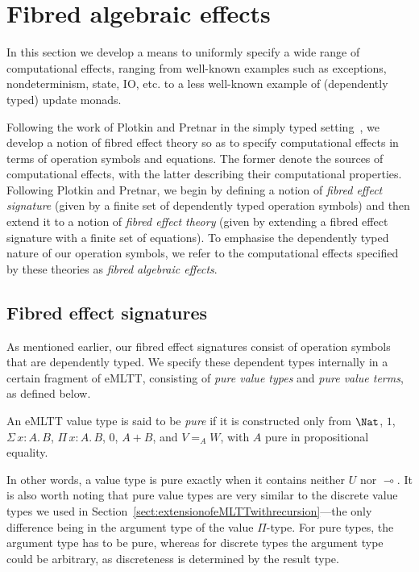 \section{Fibred algebraic effects}
\label{sect:fibeffecttheories}

In this section we develop a means to uniformly specify a wide range of computational effects, ranging from well-known examples such as exceptions, nondeterminism, state, IO, etc. to a less well-known example of (dependently typed) update monads. 

Following the work of Plotkin and Pretnar in the simply typed setting~\cite{Plotkin:HandlingEffects}, we develop a notion of fibred effect theory so as to specify computational effects in terms of operation symbols and equations. 
The former denote the sources of computational effects, with the latter describing their computational properties. 
Following Plotkin and Pretnar, we begin by defining a notion of \emph{fibred effect signature} (given by a finite set of dependently typed operation symbols) and then extend it to a notion of \emph{fibred effect theory} (given by extending a fibred effect signature with a finite set of equations).
To emphasise the dependently typed nature of our operation symbols, we refer to the computational effects specified by these theories as \emph{fibred algebraic effects}. 

\subsection{Fibred effect signatures}

As mentioned earlier, our fibred effect signatures consist of operation symbols that are dependently typed. We specify these dependent types internally in a certain fragment of eMLTT, consisting of  \emph{pure value types} and \emph{pure value terms}, as defined below. 

\begin{definition}
An eMLTT value type is said to be \emph{pure} if it is constructed only from $\Nat$, $1$, $\Sigma \, x \!:\! A .\, B $, $\Pi \, x \!:\! A .\, B$, $0$, $A + B$, and $V =_A W$, with $A$ pure in propositional equality.
\end{definition}

In other words, a value type is pure exactly when it contains neither $U$ nor $\multimap$.
It is also worth noting that pure value types are very similar to the discrete value types we used in Section~\ref{sect:extensionofeMLTTwithrecursion}---the only difference being in the argument type of the value $\Pi$-type. For pure types, the argument type has to be pure, whereas for discrete types the argument type could be arbitrary, as discreteness is determined by the result type.

